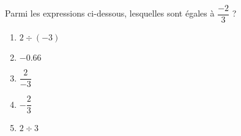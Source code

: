 
\begin{exercice}\label{exosmath-0752}

    Parmi les expressions ci-dessous, lesquelles sont égales à \( \dfrac{ -2 }{ 3 }\) ?
    \begin{multicols}{2}
        \begin{enumerate}
            \item
                 \( 2\div(-3)\)
             \item
                 \( -0.66\)
             \item
                 \( \dfrac{ 2 }{ -3 }\)
             \item
                 \( -\dfrac{ 2 }{ 3 }\)
             \item
                \( 2\div 3\)
        \end{enumerate}
    \end{multicols}

\end{exercice}
